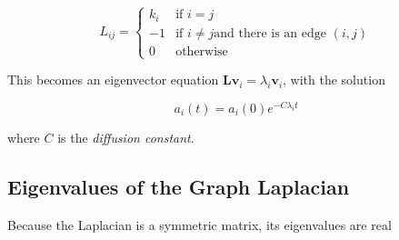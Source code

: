 \documentclass[12pt]{book}
\begin{document}
\begin{equation}
L_{ij} = \begin{cases}
  k_i & \mbox{if} \,\, i = j \\
  -1  & \mbox{if} \,\, i \neq j \mbox{and there is an edge} \,\, (i,j) \\
  0   & \mbox{otherwise}
\end{cases}
\end{equation}

This becomes an eigenvector equation $\mathbf{Lv}_i = \lambda_i\mathbf{v}_i$, with the solution

\begin{equation}
a_i(t) = a_i(0)e^{-C\lambda_i t}
\end{equation}

where $C$ is the \textit{diffusion constant}.

\subsection{Eigenvalues of the Graph Laplacian}
Because the Laplacian is a symmetric matrix, its eigenvalues are real
\end{document}
